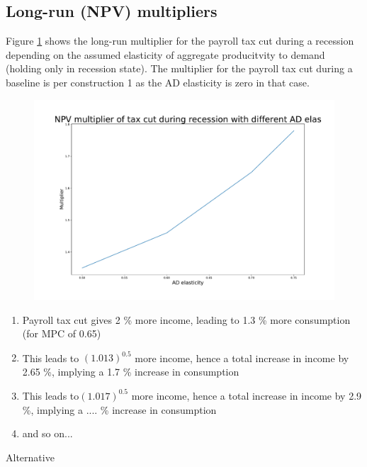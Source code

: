 \documentclass[]{article}
\begin{document}
\FloatBarrier
\subsection{Long-run (NPV) multipliers}

Figure \ref{fig:longrunmultipliertaxcutsenselas} shows the long-run multiplier for the payroll tax cut during a recession depending on the assumed elasticity of aggregate producitvity to demand (holding only in recession state). The multiplier for the payroll tax cut during a baseline is per construction 1 as the AD elasticity is zero in that case.

\begin{figure}[h]
	\centering
	\includegraphics[width=\linewidth]{../Full_Run_Mar11_AD_Elas075/Longrun_Multiplier_TaxCut_SensElas}
	\caption{}
	\label{fig:longrunmultipliertaxcutsenselas}
\end{figure}

\begin{enumerate}
	\item Payroll tax cut gives 2 \% more income, leading to 1.3 \% more consumption (for MPC of 0.65)
	\item This leads to $(1.013)^{0.5}$ more income, hence a total increase in income by 2.65 \%, implying a 1.7 \% increase in consumption
	\item This leads to$(1.017)^{0.5}$ more income, hence a total increase in income by 2.9 \%, implying a .... \% increase in consumption
	\item and so on...
\end{enumerate}

Alternative
\end{document}
